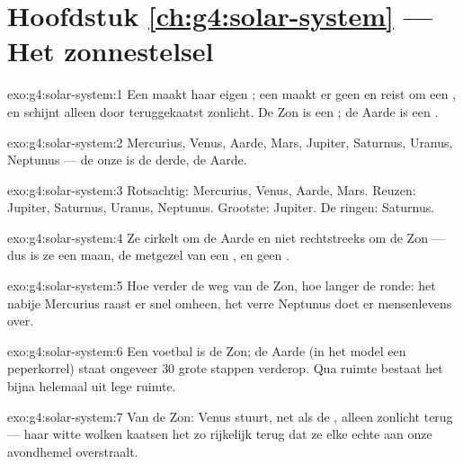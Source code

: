 \section*{Hoofdstuk \ref{ch:g4:solar-system} --- Het zonnestelsel}

\begin{solution}{exo:g4:solar-system:1}
Een  maakt haar eigen ; een  maakt er geen en
reist om een , en schijnt alleen door teruggekaatst zonlicht. De
Zon is een ; de Aarde is een .
\end{solution}

\begin{solution}{exo:g4:solar-system:2}
Mercurius, Venus, Aarde, Mars, Jupiter, Saturnus, Uranus, Neptunus
--- de onze is de derde, de Aarde.
\end{solution}

\begin{solution}{exo:g4:solar-system:3}
Rotsachtig: Mercurius, Venus, Aarde, Mars. Reuzen: Jupiter, Saturnus,
Uranus, Neptunus. Grootste: Jupiter. De ringen: Saturnus.
\end{solution}

\begin{solution}{exo:g4:solar-system:4}
Ze cirkelt om de Aarde en niet rechtstreeks om de Zon --- dus is ze
een maan, de metgezel van een , en geen .
\end{solution}

\begin{solution}{exo:g4:solar-system:5}
Hoe verder de weg van de Zon, hoe langer de ronde: het nabije
Mercurius raast er snel omheen, het verre Neptunus doet er
mensenlevens over.
\end{solution}

\begin{solution}{exo:g4:solar-system:6}
Een voetbal is de Zon; de Aarde (in het model een peperkorrel) staat
ongeveer $30$ grote stappen verderop. Qua ruimte bestaat het
 bijna helemaal uit lege ruimte.
\end{solution}

\begin{solution}{exo:g4:solar-system:7}
Van de Zon: Venus stuurt, net als de , alleen zonlicht terug ---
haar witte wolken kaatsen het zo rijkelijk terug dat ze elke echte
 aan onze avondhemel overstraalt.
\end{solution}

